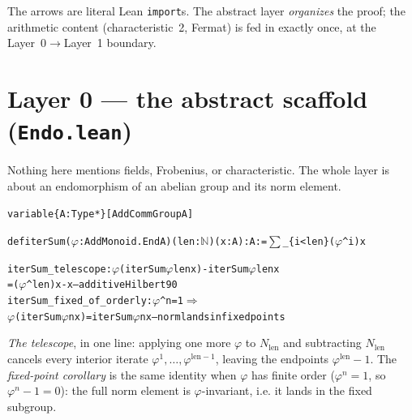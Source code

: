\documentclass[11pt]{article}
\newenvironment{lean}{\begin{leanbox}\begin{alltt}\small}{\end{alltt}\end{leanbox}}
\newcommand{\ck}{\textcolor{grn}{\checkmark}}
\newcommand{\lc}[1]{\texttt{\small #1}}
\newcommand{\phiop}{\varphi}
\begin{document}
\noindent The arrows are literal Lean \lc{import}s. The abstract layer
\emph{organizes} the proof; the arithmetic content (characteristic~2, Fermat) is
fed in exactly once, at the Layer~0$\to$Layer~1 boundary.

\section{Layer 0 --- the abstract scaffold (\texttt{Endo.lean})}

Nothing here mentions fields, Frobenius, or characteristic. The whole layer is
about an endomorphism of an abelian group and its norm element.
\begin{lean}
variable \{A : Type*\} [AddCommGroup A]

def iterSum (\(\phiop\) : AddMonoid.End A) (len : \(\mathbb{N}\)) (x : A) : A := \(\sum\)\_\{i<len\} (\(\phiop\)^i) x

iterSum_telescope        : \(\phiop\)(iterSum \(\phiop\) len x) - iterSum \(\phiop\) len x
                             = (\(\phiop\)^len) x - x                       \ck  -- additive Hilbert 90
iterSum_fixed_of_orderly : \(\phiop\)^n = 1 \(\Rightarrow\)
                             \(\phiop\)(iterSum \(\phiop\) n x) = iterSum \(\phiop\) n x   \ck  -- norm lands in fixed points
\end{lean}
\emph{The telescope}, in one line: applying one more $\phiop$ to $N_{\text{len}}$
and subtracting $N_{\text{len}}$ cancels every interior iterate $\phiop^1,\dots,
\phiop^{\text{len}-1}$, leaving the endpoints $\phiop^{\text{len}}-1$. The
\emph{fixed-point corollary} is the same identity when $\phiop$ has finite order
($\phiop^n=1$, so $\phiop^n-1=0$): the full norm element is $\phiop$-invariant,
i.e. it lands in the fixed subgroup.

\begin{center}
\end{center}
\end{document}
